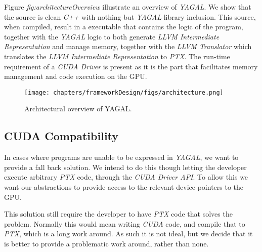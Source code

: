 Figure \textit{fig:architectureOverview} illustrate an overview of \textit{YAGAL}. We show that the source is clean \textit{C++} with nothing but \textit{YAGAL} library inclusion. This source, when compiled, result in a executable that contains the logic of the program, together with the \textit{YAGAL} logic to both generate \textit{LLVM Intermediate Representation} and manage memory, together with the \textit{LLVM Translator} which translates the \textit{LLVM Intermediate Representation} to \textit{PTX}. The run-time requirement of a \textit{CUDA Driver} is present as it is the part that facilitates memory management and code execution on the GPU.

\begin{figure}[H]
\center
\texttt{[image: chapters/frameworkDesign/figs/architecture.png]}
\caption{Architectural overview of YAGAL.}
\label{fig:architectureOverview}
\end{figure}


\subsection{CUDA Compatibility}
In cases where programs are unable to be expressed in \textit{YAGAL}, we want to provide a fall back solution. We intend to do this though letting the developer execute arbitrary \textit{PTX} code, through the \textit{CUDA Driver API}. To allow this we want our abstractions to provide access to the relevant device pointers to the GPU.

This solution still require the developer to have \textit{PTX} code that solves the problem. Normally this would mean writing \textit{CUDA} code, and compile that to \textit{PTX}, which is a long work around. As such it is not ideal, but we decide that it is better to provide a problematic work around, rather than none.